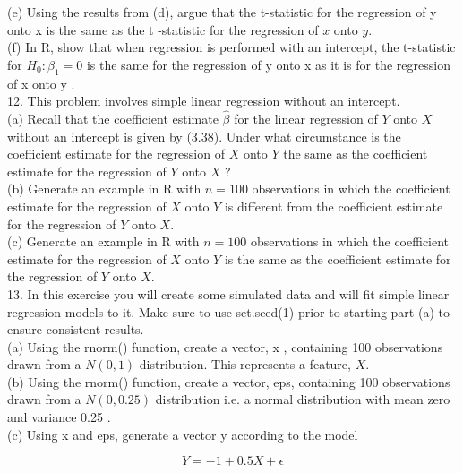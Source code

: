 \documentclass[10pt]{article}
\begin{document}
(e) Using the results from (d), argue that the t-statistic for the regression of y onto x is the same as the t -statistic for the regression of $x$ onto $y$.\\
(f) In R, show that when regression is performed with an intercept, the t-statistic for $H_{0}: \beta_{1}=0$ is the same for the regression of y onto x as it is for the regression of x onto y .\\
12. This problem involves simple linear regression without an intercept.\\
(a) Recall that the coefficient estimate $\hat{\beta}$ for the linear regression of $Y$ onto $X$ without an intercept is given by (3.38). Under what circumstance is the coefficient estimate for the regression of $X$ onto $Y$ the same as the coefficient estimate for the regression of $Y$ onto $X$ ?\\
(b) Generate an example in R with $n=100$ observations in which the coefficient estimate for the regression of $X$ onto $Y$ is different from the coefficient estimate for the regression of $Y$ onto $X$.\\
(c) Generate an example in R with $n=100$ observations in which the coefficient estimate for the regression of $X$ onto $Y$ is the same as the coefficient estimate for the regression of $Y$ onto $X$.\\
13. In this exercise you will create some simulated data and will fit simple linear regression models to it. Make sure to use set.seed(1) prior to starting part (a) to ensure consistent results.\\
(a) Using the rnorm() function, create a vector, x , containing 100 observations drawn from a $N(0,1)$ distribution. This represents a feature, $X$.\\
(b) Using the rnorm() function, create a vector, eps, containing 100 observations drawn from a $N(0,0.25)$ distribution i.e. a normal distribution with mean zero and variance 0.25 .\\
(c) Using x and eps, generate a vector y according to the model


\begin{equation*}
Y=-1+0.5 X+\epsilon \tag{3.39}
\end{equation*}
\end{document}
